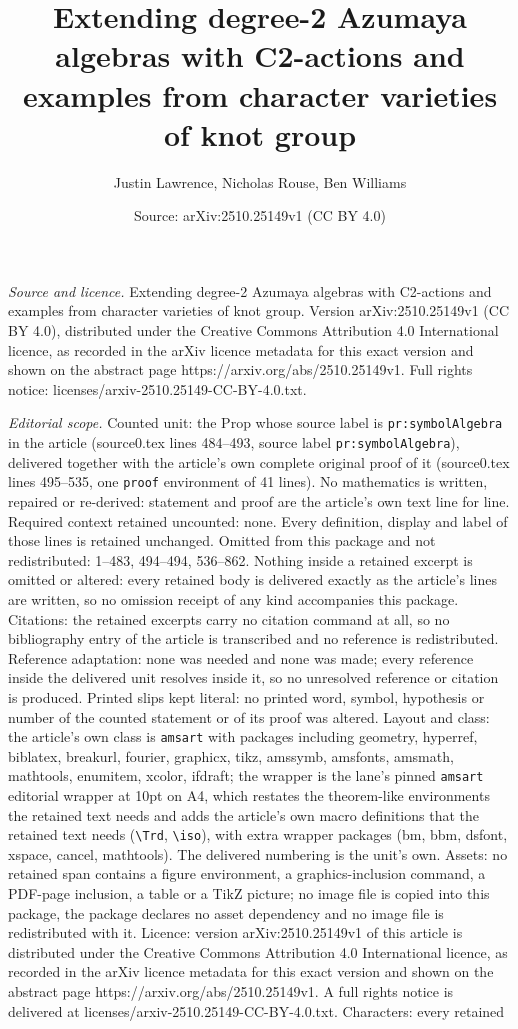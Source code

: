 \documentclass[10pt,a4paper]{amsart}
\title[Extending degree-2 Azumaya algebras with C2-actions and exam]{Extending degree-2 Azumaya algebras with C2-actions and examples from character varieties of knot group}
\author{Justin Lawrence, Nicholas Rouse, Ben Williams}
\date{Source: arXiv:2510.25149v1 (CC BY 4.0)}
\begin{document}
\maketitle

\noindent\emph{Source and licence.} Extending degree-2 Azumaya algebras with C2-actions and examples from character varieties of knot group. Version arXiv:2510.25149v1 (CC BY 4.0), distributed under the Creative Commons Attribution 4.0 International licence, as recorded in the arXiv licence metadata for this exact version and shown on the abstract page https://arxiv.org/abs/2510.25149v1. Full rights notice: licenses/arxiv-2510.25149-CC-BY-4.0.txt.\par\smallskip

\noindent\textit{Editorial scope.} Counted unit: the Prop whose source label is \texttt{pr:symbolAlgebra} in the article (source0.tex lines 484--493, source label \texttt{pr:symbolAlgebra}), delivered together with the article's own complete original proof of it (source0.tex lines 495--535, one \texttt{proof} environment of 41 lines). No mathematics is written, repaired or re-derived: statement and proof are the article's own text line for line. Required context retained uncounted: none. Every definition, display and label of those lines is retained unchanged. Omitted from this package and not redistributed: 1--483, 494--494, 536--862. Nothing inside a retained excerpt is omitted or altered: every retained body is delivered exactly as the article's lines are written, so no omission receipt of any kind accompanies this package. Citations: the retained excerpts carry no citation command at all, so no bibliography entry of the article is transcribed and no reference is redistributed. Reference adaptation: none was needed and none was made; every reference inside the delivered unit resolves inside it, so no unresolved reference or citation is produced. Printed slips kept literal: no printed word, symbol, hypothesis or number of the counted statement or of its proof was altered. Layout and class: the article's own class is \texttt{amsart} with packages including geometry, hyperref, biblatex, breakurl, fourier, graphicx, tikz, amssymb, amsfonts, amsmath, mathtools, enumitem, xcolor, ifdraft; the wrapper is the lane's pinned \texttt{amsart} editorial wrapper at 10pt on A4, which restates the theorem-like environments the retained text needs and adds the article's own macro definitions that the retained text needs (\texttt{\textbackslash Trd}, \texttt{\textbackslash iso}), with extra wrapper packages (bm, bbm, dsfont, xspace, cancel, mathtools). The delivered numbering is the unit's own. Assets: no retained span contains a figure environment, a graphics-inclusion command, a PDF-page inclusion, a table or a TikZ picture; no image file is copied into this package, the package declares no asset dependency and no image file is redistributed with it. Licence: version arXiv:2510.25149v1 of this article is distributed under the Creative Commons Attribution 4.0 International licence, as recorded in the arXiv licence metadata for this exact version and shown on the abstract page https://arxiv.org/abs/2510.25149v1. A full rights notice is delivered at licenses/arxiv-2510.25149-CC-BY-4.0.txt. Characters: every retained 
\end{document}
